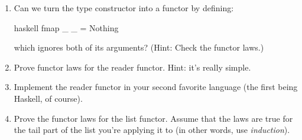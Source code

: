 \begin{enumerate}
\tightlist
\item
  Can we turn the  type constructor into a functor by
  defining:

\begin{snip}{haskell}
fmap _ _ = Nothing
\end{snip}

  which ignores both of its arguments? (Hint: Check the functor laws.)
\item
  Prove functor laws for the reader functor. Hint: it's really simple.
\item
  Implement the reader functor in your second favorite language (the
  first being Haskell, of course).
\item
  Prove the functor laws for the list functor. Assume that the laws are
  true for the tail part of the list you're applying it to (in other
  words, use \emph{induction}).
\end{enumerate}
